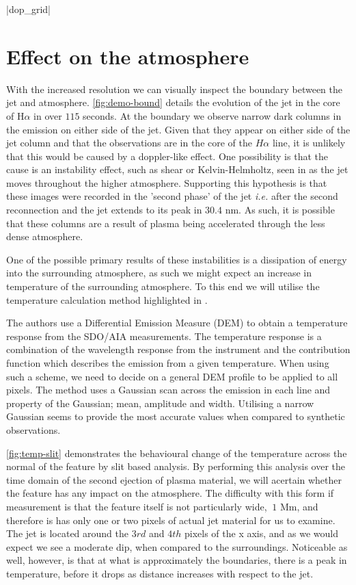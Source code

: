 \py[chapter5]|dop_grid|





\section{Effect on the atmosphere}
\label{sec:temp_map_sect}

With the increased resolution we can visually inspect the boundary between the jet and atmosphere.
\cref{fig:demo-bound} details the evolution of the jet in the core of H$\alpha$ in over $115$ seconds.
At the boundary we observe narrow dark columns in the emission on either side of the jet.
Given that they appear on either side of the jet column and that the observations are in the core of the $H\alpha$ line, it is unlikely that this would be caused by a doppler-like effect.
One possibility is that the cause is an instability effect, such as shear or Kelvin-Helmholtz, seen in \cite{Zaqarashvili2014} as the jet moves throughout the higher atmosphere.
Supporting this hypothesis is that these images were recorded in the 'second phase' of the jet \emph{i.e.} after the second reconnection and the jet extends to its peak in $30.4$ nm. 
As such, it is possible that these columns are a result of plasma being accelerated through the less dense atmosphere.

One of the possible primary results of these instabilities is a dissipation of energy into the surrounding atmosphere, as such we might expect an increase in temperature of the surrounding atmosphere.
To this end we will utilise the temperature calculation method highlighted in \cite{Leonard2014}.

The authors use a Differential Emission Measure (DEM) to obtain a temperature response from the SDO/AIA measurements.
The temperature response is a combination of the wavelength response from the instrument and the contribution function which describes the emission from a given temperature.
When using such a scheme, we need to decide on a general DEM profile to be applied to all pixels.
The method uses a Gaussian scan across the emission in each line and property of the Gaussian; mean, amplitude and width. 
Utilising a narrow Gaussian seems to provide the most accurate values when compared to synthetic observations.

\cref{fig:temp-slit} demonstrates the behavioural change of the temperature across the normal of the feature by slit based analysis.
By performing this analysis over the time domain of the second ejection of plasma material, we will acertain whether the feature has any impact on the atmosphere.
The difficulty with this form if measurement is that the feature itself is not particularly wide, $~1$ Mm, and therefore is has only one or two pixels of actual jet material for us to examine.
The jet is located around the $3rd$ and $4th$ pixels of the x axis, and as we would expect we see a moderate dip, when compared to the surroundings. 
Noticeable as well, however, is that at what is approximately the boundaries, there is a peak in temperature, before it drops as distance increases with respect to the jet.

